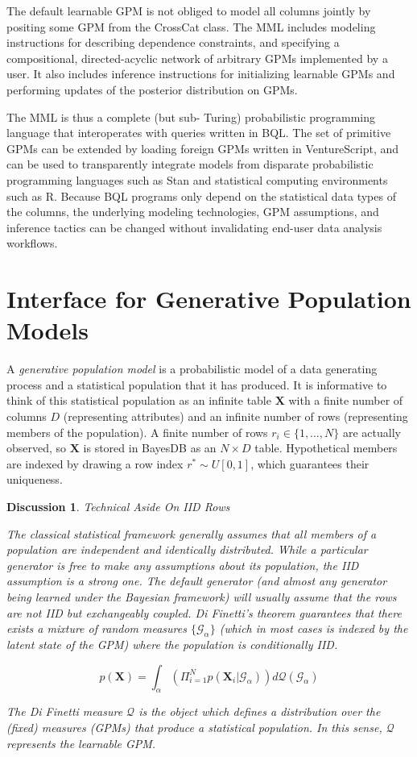 \documentclass[10pt,letterpaper]{article}
\newtheorem{discussion}{Discussion}[section]
\newcommand{\set}[1]{\{#1\}}
\begin{document}
The default learnable GPM is not obliged to model all columns jointly by positing some GPM from the CrossCat class. The MML includes modeling instructions for describing dependence constraints, and specifying a
compositional, directed-acyclic network of arbitrary GPMs implemented by a user. It also includes inference instructions for initializing learnable GPMs and performing updates of the posterior distribution on GPMs.

The MML is thus a complete (but sub-
Turing) probabilistic programming language that interoperates with queries
written in BQL. The set of primitive GPMs can be extended by loading
foreign GPMs written in VentureScript, and can be used to transparently
integrate models from disparate probabilistic programming languages such as Stan
and statistical computing environments such as R. Because BQL programs only
depend on the statistical data types of the columns, the underlying modeling
technologies, GPM assumptions, and inference tactics can be changed without invalidating end-user data analysis workflows.

\section{Interface for Generative Population Models} \label{sec:generators}
A \textit{generative population model} is a probabilistic model of a data generating process and a
statistical population that it has produced. It is informative to think of this
statistical population as an infinite table $\mathbf{X}$ with a finite number of
columns $D$ (representing attributes) and an infinite number of rows
(representing members of the population). A finite number of rows $r_i \in
\set{1,\dots,N}$ are actually observed, so $\mathbf{X}$ is stored in BayesDB as an $N \times D$ table. Hypothetical members are indexed by drawing a row index
$r^*\sim U[0,1]$, which guarantees their uniqueness.

\begin{discussion} \label{disc:iid} Technical Aside On IID Rows

The classical statistical framework generally assumes that all members of a
population are independent and identically distributed. While a particular
generator is free to make any assumptions about its population, the IID
assumption is a strong one. The default generator (and almost any generator
being learned under the Bayesian framework) will usually assume that the rows
are not IID but exchangeably coupled. Di Finetti's theorem guarantees that there
exists a mixture of random measures $\set{\mathcal{G}_\alpha}$ (which in most cases is indexed by the latent state of the GPM) where the population is conditionally IID.

$$p(\mathbf{X}) = \int_\alpha{(\Pi_{i=1}^Np(\mathbf{X}_i|\mathcal{G}_\alpha))d\mathcal{Q}(\mathcal{G}_\alpha)}$$

The Di Finetti measure $\mathcal{Q}$ is the object which defines a distribution over the (fixed) measures (GPMs) that produce a statistical population. In this sense, $\mathcal{Q}$ represents the learnable GPM.

\end{discussion}
\end{document}
